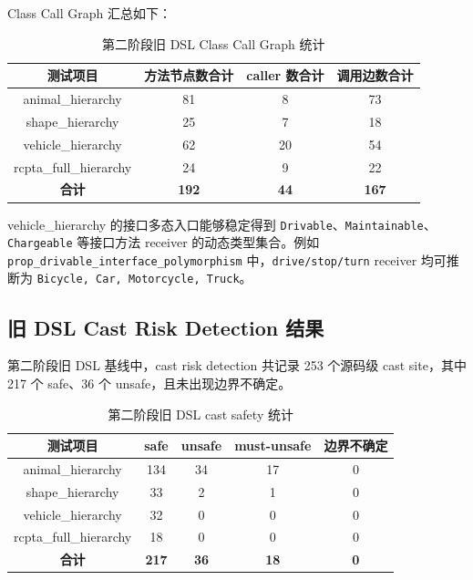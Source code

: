 \documentclass[10.5pt,compsoc,UTF8]{cjc}
\theoremstyle{mystyle}
\begin{document}
Class Call Graph 汇总如下：

\begin{table}[H]
\centering
\begin{tabular}{|c|c|c|c|}
\hline
\textbf{测试项目} & \textbf{方法节点数合计} & \textbf{caller 数合计} & \textbf{调用边数合计} \\ \hline
animal\_hierarchy & 81 & 8 & 73 \\ \hline
shape\_hierarchy & 25 & 7 & 18 \\ \hline
vehicle\_hierarchy & 62 & 20 & 54 \\ \hline
rcpta\_full\_hierarchy & 24 & 9 & 22 \\ \hline
\textbf{合计} & \textbf{192} & \textbf{44} & \textbf{167} \\ \hline
\end{tabular}
\caption{第二阶段旧 DSL Class Call Graph 统计}
\label{tab:phase2_old_cg}
\end{table}

vehicle\_hierarchy 的接口多态入口能够稳定得到 \texttt{Drivable}、\texttt{Maintainable}、\texttt{Chargeable} 等接口方法 receiver 的动态类型集合。例如 \texttt{prop\_drivable\_interface\_polymorphism} 中，\texttt{drive/stop/turn} receiver 均可推断为 \texttt{Bicycle, Car, Motorcycle, Truck}。

\subsection{旧 DSL Cast Risk Detection 结果}

第二阶段旧 DSL 基线中，cast risk detection 共记录 253 个源码级 cast site，其中 217 个 safe、36 个 unsafe，且未出现边界不确定。

\begin{table}[H]
\centering
\begin{tabular}{|c|c|c|c|c|}
\hline
\textbf{测试项目} & \textbf{safe} & \textbf{unsafe} & \textbf{must-unsafe} & \textbf{边界不确定} \\ \hline
animal\_hierarchy & 134 & 34 & 17 & 0 \\ \hline
shape\_hierarchy & 33 & 2 & 1 & 0 \\ \hline
vehicle\_hierarchy & 32 & 0 & 0 & 0 \\ \hline
rcpta\_full\_hierarchy & 18 & 0 & 0 & 0 \\ \hline
\textbf{合计} & \textbf{217} & \textbf{36} & \textbf{18} & \textbf{0} \\ \hline
\end{tabular}
\caption{第二阶段旧 DSL cast safety 统计}
\label{tab:phase2_old_cast}
\end{table}
\end{document}
